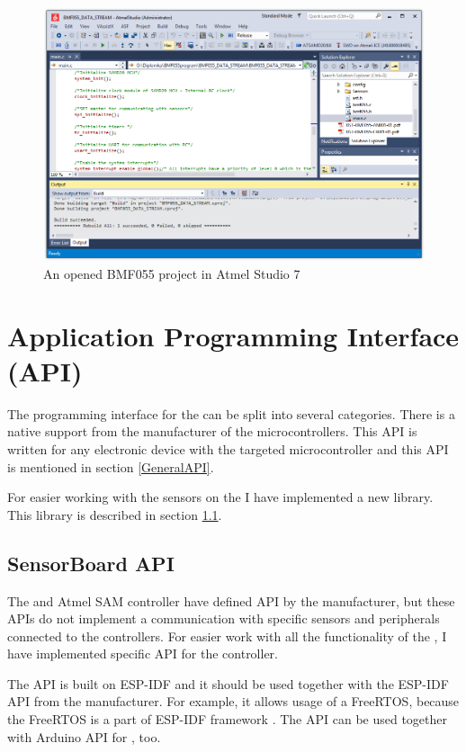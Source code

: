 \begin{figure}
    \centering
    \caption{An opened BMF055 project in Atmel Studio 7}
    \label{BMF055AtmelStudio}
    \includegraphics[width=\linewidth]{img/BMF055AtmelStudio.png}
\end{figure}

\section{Application Programming Interface (API)}
The programming interface for the  can be split into several categories. There is a native support from the manufacturer of the microcontrollers. This \ac{API} is written for any electronic device with the targeted microcontroller and this \ac{API} is mentioned in section \ref{GeneralAPI}.

For easier working with the sensors on the  I have implemented a new library. This library is described in section \ref{SensorBoardAPI}.

\subsection{SensorBoard API}
\label{SensorBoardAPI}
The  and Atmel SAM controller have defined \ac{API} by the manufacturer, but these \ac{API}s do not implement a communication with specific sensors and peripherals connected to the controllers. For easier work with all the functionality of the , I have implemented specific \ac{API} for the  controller.

The \ac{API} is built on \ac{ESP-IDF} and it should be used together with the \ac{ESP-IDF} \ac{API} from the manufacturer. For example, it allows usage of a FreeRTOS, because the FreeRTOS is a part of \ac{ESP-IDF} framework \cite{espressif:ESP-WROOM-32}. The  \ac{API} can be used together with Arduino \ac{API} for , too.

